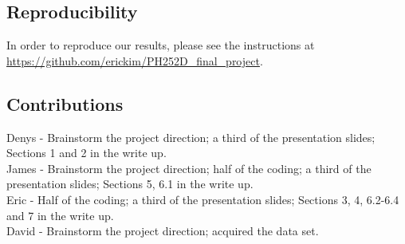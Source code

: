 \documentclass[english, 12pt]{article}
\begin{document}
\subsection{Reproducibility}
In order to reproduce our results, please see the instructions at \url{https://github.com/erickim/PH252D_final_project}.

\subsection{Contributions}
Denys - Brainstorm the project direction; a third of the presentation slides; Sections 1 and 2 in the write up. \\
James - Brainstorm the project direction; half of the coding; a third of the presentation slides; Sections 5, 6.1 in the write up. \\
Eric - Half of the coding; a third of the presentation slides; Sections 3, 4, 6.2-6.4 and 7 in the write up. \\
David - Brainstorm the project direction; acquired the data set.
\end{document}
